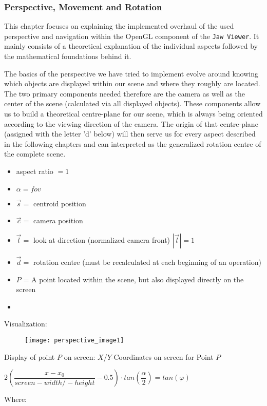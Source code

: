\subsubsection{Perspective, Movement and Rotation}
This chapter focuses on explaining the implemented overhaul of the used perspective and navigation within the OpenGL component of the \verb|Jaw Viewer|. It mainly consists of a theoretical explanation of the individual aspects followed by the mathematical foundations behind it.

The basics of the perspective we have tried to implement evolve around knowing which objects are displayed within our scene and where they roughly are located. The two primary components needed therefore are the camera as well as the center of the scene (calculated via all displayed objects).
These components allow us to build a theoretical centre-plane for our scene, which is always being oriented according to the viewing direction of the camera. The origin of that centre-plane (assigned with the letter 'd' below) will then serve us for every aspect described in the following chapters and can interpreted as the generalized rotation centre of the complete scene.

\begin{itemize}
	\item[] aspect ratio $= 1$
	\item[] $\alpha = fov$
	\item[] $\overrightarrow{s}=$ centroid position
	\item[] $\overrightarrow{c}=$ camera position
	\item[] $\overrightarrow{l}=$ look at direction (normalized camera front) $|\overrightarrow{l}|= 1$ 
	\item[] $\overrightarrow{d}=$ rotation centre (must be recalculated at each beginning of an operation)
	\item[] $P$ = A point located within the scene, but also displayed directly on the screen
	\item[] 
\end{itemize}
Visualization:
\begin{figure}[h!]
	\centering
	\texttt{[image: perspective\_image1]}
\end{figure}

Display of point $P$ on screen:\newline
$X$/$Y$-Coordinates on screen for Point $P$ \newline
\centerline{$\boxed{ 2 \left(\dfrac{x - x_{0}}{screen-width/-height} - 0.5\right)\cdot tan \left(\dfrac{\alpha}{2}\right) = tan(\varphi)}$}
Where: 

